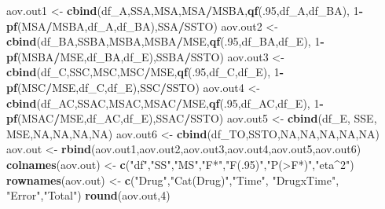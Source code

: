 \documentclass[
]{book}
\newenvironment{Shaded}{\begin{snugshade}}{\end{snugshade}}
\newcommand{\ConstantTok}[1]{\textcolor[rgb]{0.56,0.35,0.01}{#1}}
\newcommand{\DecValTok}[1]{\textcolor[rgb]{0.00,0.00,0.81}{#1}}
\newcommand{\FunctionTok}[1]{\textcolor[rgb]{0.13,0.29,0.53}{\textbf{#1}}}
\newcommand{\NormalTok}[1]{#1}
\newcommand{\OtherTok}[1]{\textcolor[rgb]{0.56,0.35,0.01}{#1}}
\newcommand{\SpecialCharTok}[1]{\textcolor[rgb]{0.81,0.36,0.00}{\textbf{#1}}}
\newcommand{\StringTok}[1]{\textcolor[rgb]{0.31,0.60,0.02}{#1}}
\begin{document}
\begin{Shaded}
\begin{Highlighting}[]
\NormalTok{aov.out1 }\OtherTok{\textless{}{-}} \FunctionTok{cbind}\NormalTok{(df\_A,SSA,MSA,MSA}\SpecialCharTok{/}\NormalTok{MSBA,}\FunctionTok{qf}\NormalTok{(.}\DecValTok{95}\NormalTok{,df\_A,df\_BA),}
                  \DecValTok{1}\SpecialCharTok{{-}}\FunctionTok{pf}\NormalTok{(MSA}\SpecialCharTok{/}\NormalTok{MSBA,df\_A,df\_BA),SSA}\SpecialCharTok{/}\NormalTok{SSTO)}
\NormalTok{aov.out2 }\OtherTok{\textless{}{-}} \FunctionTok{cbind}\NormalTok{(df\_BA,SSBA,MSBA,MSBA}\SpecialCharTok{/}\NormalTok{MSE,}\FunctionTok{qf}\NormalTok{(.}\DecValTok{95}\NormalTok{,df\_BA,df\_E),}
                  \DecValTok{1}\SpecialCharTok{{-}}\FunctionTok{pf}\NormalTok{(MSBA}\SpecialCharTok{/}\NormalTok{MSE,df\_BA,df\_E),SSBA}\SpecialCharTok{/}\NormalTok{SSTO)}
\NormalTok{aov.out3 }\OtherTok{\textless{}{-}} \FunctionTok{cbind}\NormalTok{(df\_C,SSC,MSC,MSC}\SpecialCharTok{/}\NormalTok{MSE,}\FunctionTok{qf}\NormalTok{(.}\DecValTok{95}\NormalTok{,df\_C,df\_E),}
                  \DecValTok{1}\SpecialCharTok{{-}}\FunctionTok{pf}\NormalTok{(MSC}\SpecialCharTok{/}\NormalTok{MSE,df\_C,df\_E),SSC}\SpecialCharTok{/}\NormalTok{SSTO)}
\NormalTok{aov.out4 }\OtherTok{\textless{}{-}} \FunctionTok{cbind}\NormalTok{(df\_AC,SSAC,MSAC,MSAC}\SpecialCharTok{/}\NormalTok{MSE,}\FunctionTok{qf}\NormalTok{(.}\DecValTok{95}\NormalTok{,df\_AC,df\_E),}
                  \DecValTok{1}\SpecialCharTok{{-}}\FunctionTok{pf}\NormalTok{(MSAC}\SpecialCharTok{/}\NormalTok{MSE,df\_AC,df\_E),SSAC}\SpecialCharTok{/}\NormalTok{SSTO)}
\NormalTok{aov.out5 }\OtherTok{\textless{}{-}} \FunctionTok{cbind}\NormalTok{(df\_E, SSE, MSE,}\ConstantTok{NA}\NormalTok{,}\ConstantTok{NA}\NormalTok{,}\ConstantTok{NA}\NormalTok{,}\ConstantTok{NA}\NormalTok{)}
\NormalTok{aov.out6 }\OtherTok{\textless{}{-}} \FunctionTok{cbind}\NormalTok{(df\_TO,SSTO,}\ConstantTok{NA}\NormalTok{,}\ConstantTok{NA}\NormalTok{,}\ConstantTok{NA}\NormalTok{,}\ConstantTok{NA}\NormalTok{,}\ConstantTok{NA}\NormalTok{)}
\NormalTok{aov.out }\OtherTok{\textless{}{-}} \FunctionTok{rbind}\NormalTok{(aov.out1,aov.out2,aov.out3,aov.out4,aov.out5,aov.out6)}
\FunctionTok{colnames}\NormalTok{(aov.out) }\OtherTok{\textless{}{-}} \FunctionTok{c}\NormalTok{(}\StringTok{"df"}\NormalTok{,}\StringTok{"SS"}\NormalTok{,}\StringTok{"MS"}\NormalTok{,}\StringTok{"F*"}\NormalTok{,}\StringTok{"F(.95)"}\NormalTok{,}\StringTok{"P(\textgreater{}F*)"}\NormalTok{,}\StringTok{"eta\^{}2"}\NormalTok{)}
\FunctionTok{rownames}\NormalTok{(aov.out) }\OtherTok{\textless{}{-}} \FunctionTok{c}\NormalTok{(}\StringTok{"Drug"}\NormalTok{,}\StringTok{"Cat(Drug)"}\NormalTok{,}\StringTok{"Time"}\NormalTok{,}
                       \StringTok{"DrugxTime"}\NormalTok{, }\StringTok{"Error"}\NormalTok{,}\StringTok{"Total"}\NormalTok{)}
\FunctionTok{round}\NormalTok{(aov.out,}\DecValTok{4}\NormalTok{)}
\end{Highlighting}
\end{Shaded}
\end{document}
